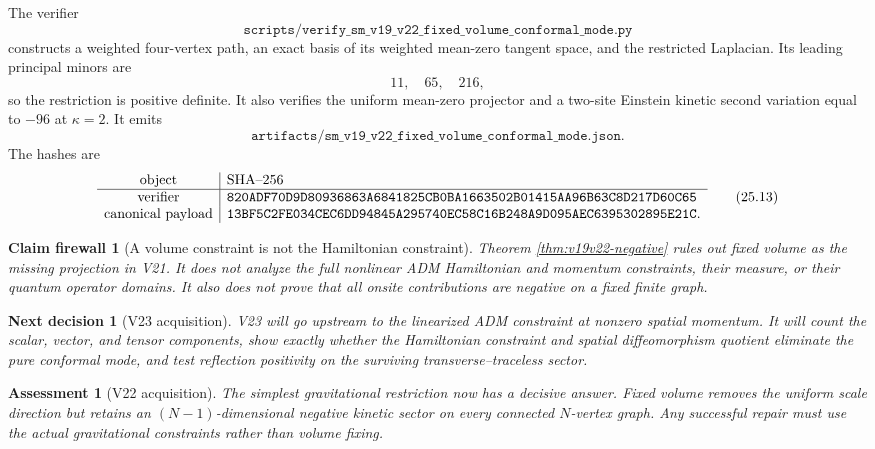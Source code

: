 \documentclass[11pt]{article}
\newtheorem{firewall}[theorem]{Claim firewall}
\newtheorem{decision}[theorem]{Next decision}
\newtheorem{assessment}[theorem]{Assessment}
\theoremstyle{remark}
\begin{document}
The verifier
\[
 \texttt{scripts/verify\_sm\_v19\_v22\_fixed\_volume\_conformal\_mode.py}
                                                                  \tag{25.11}
\]
constructs a weighted four-vertex path, an exact basis of its weighted
mean-zero tangent space, and the restricted Laplacian.  Its leading
principal minors are
\[
 11,\quad65,\quad216,
\]
so the restriction is positive definite.  It also verifies the uniform
mean-zero projector and a two-site Einstein kinetic second variation
equal to \(-96\) at \(\kappa=2\).  It emits
\[
 \texttt{artifacts/sm\_v19\_v22\_fixed\_volume\_conformal\_mode.json}.
                                                                  \tag{25.12}
\]
The hashes are
\[
\begin{array}{c|l}
\hbox{object}&\hbox{SHA--256}\\ \hline
\hbox{verifier}&
\texttt{820ADF70D9D80936863A6841825CB0BA1663502B01415AA96B63C8D217D60C65}\\
\hbox{canonical payload}&
\texttt{13BF5C2FE034CEC6DD94845A295740EC58C16B248A9D095AEC6395302895E21C}.
\end{array}                                                     \tag{25.13}
\]

\begin{firewall}[A volume constraint is not the Hamiltonian constraint]
\label{fire:v19v22}
Theorem \ref{thm:v19v22-negative} rules out fixed volume as the missing
projection in V21.  It does not analyze the full nonlinear ADM Hamiltonian
and momentum constraints, their measure, or their quantum operator
domains.  It also does not prove that all onsite contributions are
negative on a fixed finite graph.
\end{firewall}

\begin{decision}[V23 acquisition]
\label{dec:v19v22-next}
V23 will go upstream to the linearized ADM constraint at nonzero spatial
momentum.  It will count the scalar, vector, and tensor components,
show exactly whether the Hamiltonian constraint and spatial
diffeomorphism quotient eliminate the pure conformal mode, and test
reflection positivity on the surviving transverse--traceless sector.
\end{decision}

\begin{assessment}[V22 acquisition]
\label{ass:v19v22}
The simplest gravitational restriction now has a decisive answer.  Fixed
volume removes the uniform scale direction but retains an
\((N-1)\)-dimensional negative kinetic sector on every connected
\(N\)-vertex graph.  Any successful repair must use the actual
gravitational constraints rather than volume fixing.
\end{assessment}
\end{document}
